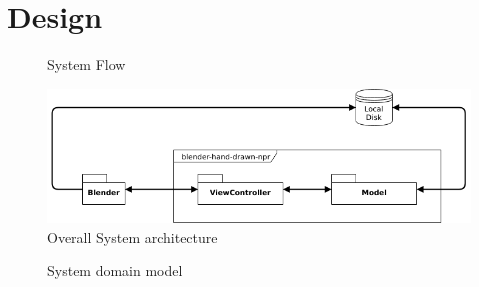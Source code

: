 \chapter{Design}\label{appendix_design}

\begin{figure}[!ht]
 \centering
 
 \caption{System Flow}\label{flow}
\end{figure}

\begin{figure}[!ht]
 \centering
 \includegraphics[width=\textwidth]{images/arch.png}
 \caption{Overall System architecture}\label{arch}
\end{figure}

\begin{figure}[!ht]
 \centering
 
 \caption{System domain model}\label{domain}
\end{figure}

